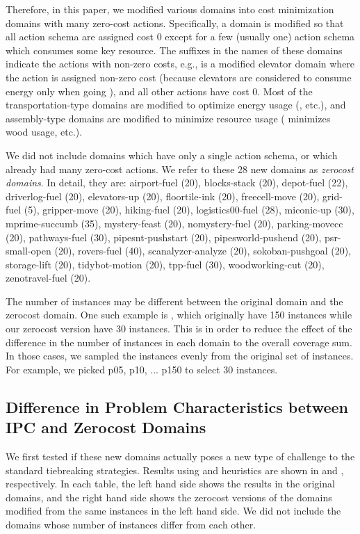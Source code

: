 Therefore, in this paper, we modified various domains
into cost minimization domains with many zero-cost actions.
Specifically, a domain is modified so that all action schema are assigned
cost 0 except for a few (usually one) action schema which consumes some key resource.
The suffixes in the names of these domains indicate the actions with non-zero costs, e.g.,  is a modified elevator
domain where the  action is assigned non-zero cost (because
elevators are considered to consume energy only when going ), and all other actions have cost 0.
Most of the transportation-type domains are modified to optimize 
energy usage (,  etc.), and  assembly-type domains are modified to minimize resource usage
( minimizes wood usage, etc.).

We did not
include domains which have only a single action schema, or which already had many zero-cost actions.
We refer to these 28 new domains as \emph{zerocost domains}.
In detail, they are:
airport-fuel (20), blocks-stack (20), depot-fuel (22), driverlog-fuel (20),
elevators-up (20), floortile-ink (20), freecell-move (20), grid-fuel (5),
gripper-move (20), hiking-fuel (20), logistics00-fuel (28), miconic-up (30),
mprime-succumb (35), mystery-feast (20), nomystery-fuel (20),
parking-movecc (20), pathways-fuel (30), pipesnt-pushstart (20),
pipesworld-pushend (20), psr-small-open (20), rovers-fuel (40),
scanalyzer-analyze (20), sokoban-pushgoal (20), storage-lift (20),
tidybot-motion (20), tpp-fuel (30), woodworking-cut (20),
zenotravel-fuel (20).

The number of instances may be different between the original domain and
the zerocost domain. One such example is , which
originally have 150 instances while our zerocost version have
30 instances.
This is in order to reduce the effect of the difference in the
number of instances in each domain to the overall coverage sum.
In those cases, we sampled the instances evenly from the original set
of instances. For example, we picked p05, p10, ... p150 to select 30
instances.

\subsection{Difference in Problem Characteristics between IPC and Zerocost Domains}

We first tested if these new domains actually poses a new type of challenge to the
standard tiebreaking strategies. Results using \lmcut and \mands
heuristics are shown in  and
, respectively. In each table, the left
hand side shows the results in the original domains, and the right hand side
shows the zerocost versions of the domains modified from the same
instances in the left hand side. We did not include the domains whose
number of instances differ from each other.

